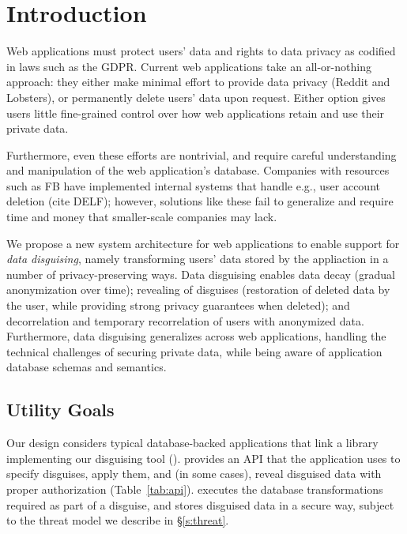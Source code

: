 \section{Introduction}
Web applications must protect users' data and rights to data privacy as codified in laws
such as the GDPR.
%
Current web applications take an all-or-nothing approach: they either make minimal effort to
provide data privacy (\eg Reddit and Lobsters), or permanently delete users'
data upon request. Either option gives users little fine-grained control over how web applications
retain and use their private data.
%

%
Furthermore, even these efforts are nontrivial, and require careful understanding and manipulation
of the web application's database. Companies with resources such as FB have implemented internal
systems that handle e.g., user account deletion (cite DELF); however, solutions like these fail to
generalize and require time and money that smaller-scale companies may lack.
%

%
We propose a new system architecture for web applications to enable support for \emph{data disguising},
namely transforming users' data stored by the appliaction in a number of privacy-preserving ways.
Data disguising enables data decay (gradual anonymization over time); revealing of disguises (restoration of deleted data by
the user, while providing strong privacy guarantees when deleted); and decorrelation and
temporary recorrelation of users with anonymized data.
Furthermore, data disguising generalizes across web applications, handling the technical 
challenges of securing private data, while being aware of application database schemas and
semantics.

\subsection{Utility Goals}
Our design considers typical database-backed applications that link a library implementing our disguising
tool (\sys).
%
\sys provides an API that the application uses to specify disguises, apply them, and (in some
cases), reveal disguised data with proper authorization (Table~\ref{tab:api}).
%
\sys executes the database transformations required as part of a disguise, and stores
disguised data in a secure way, subject to the threat model we describe in \S\ref{s:threat}.


